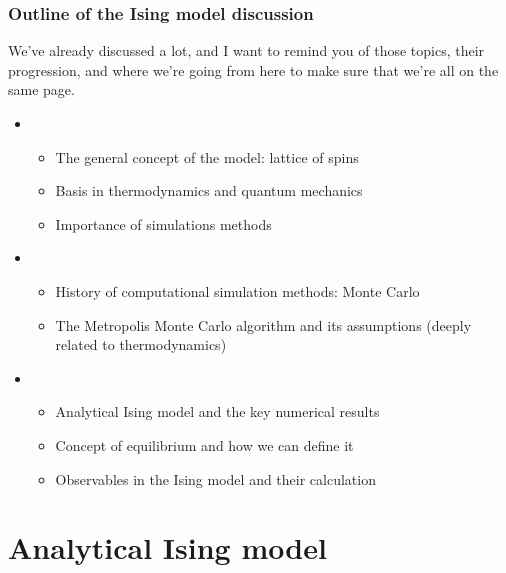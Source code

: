 \documentclass[hyperref={colorlinks=true}]{beamer}
\begin{document}
\begin{frame}%
  \frametitle{Outline of the Ising model discussion}

  We've already discussed a lot, and I want to remind you of those topics, their progression, and where we're going from here to make sure that we're all on the same page.
  
  \begin{itemize}
    \item {}
    \begin{itemize}
      \item The general concept of the model: lattice of spins
      \item Basis in thermodynamics and quantum mechanics
      \item Importance of simulations methods
    \end{itemize}
    \item {}
    \begin{itemize}
      \item History of computational simulation methods: Monte Carlo
      \item The Metropolis Monte Carlo algorithm and its assumptions (deeply related to thermodynamics)
    \end{itemize}
    \item {}
    \begin{itemize}
      \item Analytical Ising model and the key numerical results
      \item Concept of equilibrium and how we can define it
      \item Observables in the Ising model and their calculation
    \end{itemize}
  \end{itemize}

\end{frame}

\section[Analytical Ising model]{Analytical Ising model}
\end{document}
